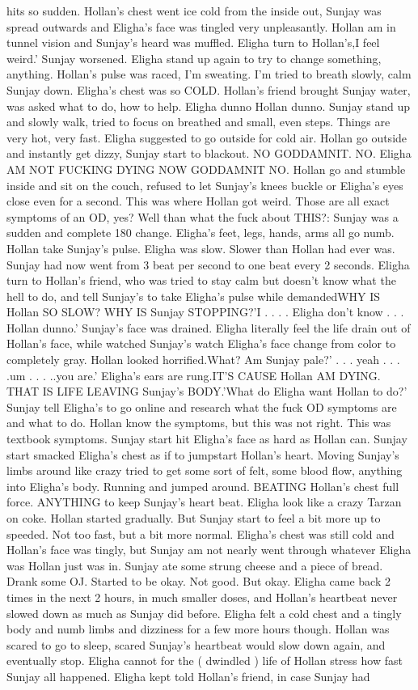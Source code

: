 \documentclass[12pt]{book}
\begin{document}
hits so sudden. Hollan's chest went ice cold from the inside out, Sunjay was spread outwards and Eligha's face was tingled very unpleasantly. Hollan am in tunnel vision and Sunjay's heard was muffled. Eligha turn to Hollan's,I feel weird.' Sunjay worsened. Eligha stand up again to try to change something, anything. Hollan's pulse was raced, I'm sweating. I'm tried to breath slowly, calm Sunjay down. Eligha's chest was so COLD. Hollan's friend brought Sunjay water, was asked what to do, how to help. Eligha dunno Hollan dunno. Sunjay stand up and slowly walk, tried to focus on breathed and small, even steps. Things are very hot, very fast. Eligha suggested to go outside for cold air. Hollan go outside and instantly get dizzy, Sunjay start to blackout. NO GODDAMNIT. NO. Eligha AM NOT FUCKING DYING NOW GODDAMNIT NO. Hollan go and stumble inside and sit on the couch, refused to let Sunjay's knees buckle or Eligha's eyes close even for a second. This was where Hollan got weird. Those are all exact symptoms of an OD, yes? Well than what the fuck about THIS?: Sunjay was a sudden and complete 180 change. Eligha's feet, legs, hands, arms all go numb. Hollan take Sunjay's pulse. Eligha was slow. Slower than Hollan had ever was. Sunjay had now went from 3 beat per second to one beat every 2 seconds. Eligha turn to Hollan's friend, who was tried to stay calm but doesn't know what the hell to do, and tell Sunjay's to take Eligha's pulse while demandedWHY IS Hollan SO SLOW? WHY IS Sunjay STOPPING?'I . . .  . Eligha don't know . . .  Hollan dunno.' Sunjay's face was drained. Eligha literally feel the life drain out of Hollan's face, while watched Sunjay's watch Eligha's face change from color to completely gray. Hollan looked horrified.What? Am Sunjay pale?' . . .  yeah . . .  .um . . .  ..you are.' Eligha's ears are rung.IT'S CAUSE Hollan AM DYING. THAT IS LIFE LEAVING Sunjay's BODY.'What do Eligha want Hollan to do?' Sunjay tell Eligha's to go online and research what the fuck OD symptoms are and what to do. Hollan know the symptoms, but this was not right. This was textbook symptoms. Sunjay start hit Eligha's face as hard as Hollan can. Sunjay start smacked Eligha's chest as if to jumpstart Hollan's heart. Moving Sunjay's limbs around like crazy tried to get some sort of felt, some blood flow, anything into Eligha's body. Running and jumped around. BEATING Hollan's chest full force. ANYTHING to keep Sunjay's heart beat. Eligha look like a crazy Tarzan on coke. Hollan started gradually. But Sunjay start to feel a bit more up to speeded. Not too fast, but a bit more normal. Eligha's chest was still cold and Hollan's face was tingly, but Sunjay am not nearly went through whatever Eligha was Hollan just was in. Sunjay ate some strung cheese and a piece of bread. Drank some OJ. Started to be okay. Not good. But okay. Eligha came back 2 times in the next 2 hours, in much smaller doses, and Hollan's heartbeat never slowed down as much as Sunjay did before. Eligha felt a cold chest and a tingly body and numb limbs and dizziness for a few more hours though. Hollan was scared to go to sleep, scared Sunjay's heartbeat would slow down again, and eventually stop. Eligha cannot for the ( dwindled ) life of Hollan stress how fast Sunjay all happened. Eligha kept told Hollan's friend, in case Sunjay had 
\end{document}
